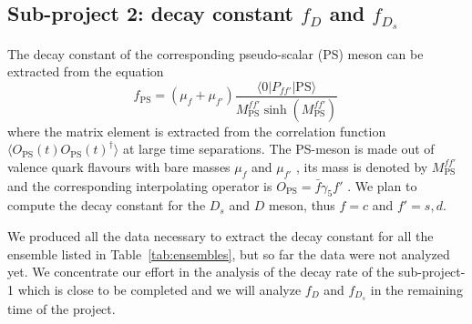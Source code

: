 \documentclass [a4paper, 11pt]{article}
\begin{document}


\subsection{Sub-project 2: decay constant $f_D$ and $f_{D_s}$}

The decay
constant of the corresponding pseudo-scalar (PS) meson can be extracted from the equation
\begin{equation}
	f_\mathrm{PS}=(\mu_f+\mu_{f'})\frac{\langle 0| P_{ff'}|
		\mathrm{PS}\rangle}{M_\mathrm{PS}^{ff'}\sinh(M_\mathrm{PS}^{ff'})}\,
\end{equation}
where the matrix element is extracted from the correlation function
$\langle O_\mathrm{PS}(t)O_\mathrm{PS}(t)^\dagger \rangle$  at large time separations. The PS-meson is made out of
valence quark flavours with bare masses $\mu_f$ and $\mu_{f'}$ ,
its mass is denoted by $M_\mathrm{PS}^{ff'}$ and the corresponding interpolating
operator is $O_\mathrm{PS}=\bar f \gamma_5 f' $ . We plan to compute the
decay constant for the $D_s$ and $D$ meson, thus $f=c$ and $f'=s,d$.

We produced all the data necessary to extract the decay constant for all the ensemble listed in
Table~\ref{tab:ensembles}, but so far the data were not analyzed yet.
We  concentrate our effort in the analysis of the decay rate of the sub-project-1 which is
close to be completed and we will analyze $f_D$ and $f_{D_s}$ in the remaining time of the project.

\end{document}
